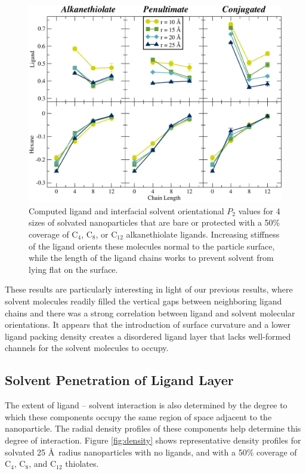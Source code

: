 \documentclass[aps,jcp,preprint,showpacs,superscriptaddress,groupedaddress]{revtex4-1}  %
\begin{document}
\begin{figure}
  \includegraphics[width=\linewidth]{figures/P2_3.pdf}
  \caption{Computed ligand and interfacial solvent orientational $P_2$
    values for 4 sizes of solvated nanoparticles that are bare or
    protected with a 50\% coverage of C$_{4}$, C$_{8}$, or C$_{12}$
    alkanethiolate ligands. Increasing stiffness of the ligand orients
    these molecules normal to the particle surface, while the length
    of the ligand chains works to prevent solvent from lying flat on
    the surface.}
  \label{fig:NPthiols_P2}
\end{figure}

These results are particularly interesting in light of our previous
results\cite{Stocker:2013cl}, where solvent molecules readily filled
the vertical gaps between neighboring ligand chains and there was a
strong correlation between ligand and solvent molecular
orientations. It appears that the introduction of surface curvature
and a lower ligand packing density creates a disordered ligand layer
that lacks well-formed channels for the solvent molecules to occupy.

\subsection{Solvent Penetration of Ligand Layer}

The extent of ligand -- solvent interaction is also determined by the
degree to which these components occupy the same region of space
adjacent to the nanoparticle. The radial density profiles of these
components help determine this degree of interaction.  Figure
\ref{fig:density} shows representative density profiles for solvated
25 \AA\ radius nanoparticles with no ligands, and with a 50\% coverage
of C$_{4}$, C$_{8}$, and C$_{12}$ thiolates.
\end{document}
